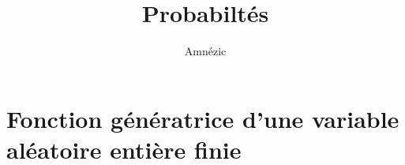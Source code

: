 \documentclass{article}
\author{Amnézic}
\date{}
\title{Probabiltés}
\begin{document}
\maketitle
\newpage
\tableofcontents
\newpage
\section{Fonction génératrice d'une variable aléatoire entière finie}
\end{document}
